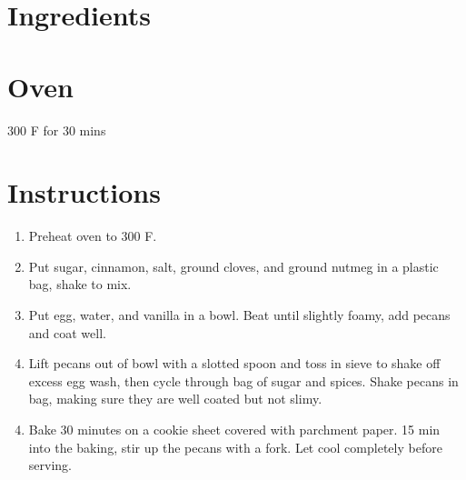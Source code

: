 \documentclass[letterpaper,10pt,english]{sphinxmanual}
\begin{document}
\section{Ingredients}
\label{\detokenize{Candied_Pecans:ingredients}}
%
\begin{sphinxVerbatim}[commandchars=\\\{\}]
  

  

   

  

  

  

  

   

   
\end{sphinxVerbatim}


\section{Oven}
\label{\detokenize{Candied_Pecans:oven}}
300 F for 30 mins


\section{Instructions}
\label{\detokenize{Candied_Pecans:instructions}}\begin{enumerate}
\item {} 
Preheat oven to 300 F.

\item {} 
Put sugar, cinnamon, salt, ground cloves, and ground nutmeg in a plastic bag, shake to mix.

\item {} 
Put egg, water, and vanilla in a bowl. Beat until slightly foamy, add pecans and coat well.

\item {} 
Lift pecans out of bowl with a slotted spoon and toss in sieve to shake off excess egg wash, then cycle through bag of sugar and spices. Shake pecans in bag, making sure they are well coated but not slimy.

\end{enumerate}
\begin{enumerate}
\setcounter{enumi}{3}
\item {} 
Bake 30 minutes on a cookie sheet covered with parchment paper. 15 min into the baking, stir up the pecans with a fork. Let cool completely before serving.

\end{enumerate}
\end{document}
